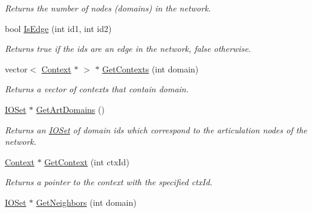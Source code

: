 \begin{DoxyCompactItemize}
\begin{DoxyCompactList}\small\item\em Returns the number of nodes (domains) in the network. \item\end{DoxyCompactList}\item 
bool \hyperlink{class_relation_graph_a647ab3afb7708f13e5ec480462dedb39}{IsEdge} (int id1, int id2)
\begin{DoxyCompactList}\small\item\em Returns true if the ids are an edge in the network, false otherwise. \item\end{DoxyCompactList}\item 
\hypertarget{class_relation_graph_acd16774976073a33da14d8461ba4165d}{
vector$<$ \hyperlink{class_context}{Context} $\ast$ $>$ $\ast$ \hyperlink{class_relation_graph_acd16774976073a33da14d8461ba4165d}{GetContexts} (int domain)}
\label{class_relation_graph_acd16774976073a33da14d8461ba4165d}

\begin{DoxyCompactList}\small\item\em Returns a vector of contexts that contain domain. \item\end{DoxyCompactList}\item 
\hypertarget{class_relation_graph_adf3c6bb0287acf5e5569b88a3d3a9326}{
\hyperlink{class_i_o_set}{IOSet} $\ast$ \hyperlink{class_relation_graph_adf3c6bb0287acf5e5569b88a3d3a9326}{GetArtDomains} ()}
\label{class_relation_graph_adf3c6bb0287acf5e5569b88a3d3a9326}

\begin{DoxyCompactList}\small\item\em Returns an \hyperlink{class_i_o_set}{IOSet} of domain ids which correspond to the articulation nodes of the network. \item\end{DoxyCompactList}\item 
\hypertarget{class_relation_graph_afb733508ef74b8b09adda722af855f32}{
\hyperlink{class_context}{Context} $\ast$ \hyperlink{class_relation_graph_afb733508ef74b8b09adda722af855f32}{GetContext} (int ctxId)}
\label{class_relation_graph_afb733508ef74b8b09adda722af855f32}

\begin{DoxyCompactList}\small\item\em Returns a pointer to the context with the specified ctxId. \item\end{DoxyCompactList}\item 
\hypertarget{class_relation_graph_a82dafd34929842c2ddf93d42551db4f1}{
\hyperlink{class_i_o_set}{IOSet} $\ast$ \hyperlink{class_relation_graph_a82dafd34929842c2ddf93d42551db4f1}{GetNeighbors} (int domain)}
\label{class_relation_graph_a82dafd34929842c2ddf93d42551db4f1}


\end{DoxyCompactItemize}
